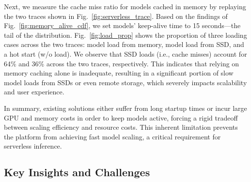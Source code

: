 Next, we measure the cache miss ratio for models cached in memory 
by replaying the two traces shown in Fig.~\ref{fig:serverless_trace}.
Based on the findings of Fig.~\ref{fig:memory_alive_cdf}, we set models' keep-alive time to 15 seconds---the tail of the distribution.
Fig.~\ref{fig:load_prop} shows the proportion of three loading cases across the two traces: model load from memory, model load from SSD, and a hot start (w/o load). 
We observe that SSD loads (i.e., cache misses) account for 64\% and 36\% across the two traces, respectively.
This indicates that relying on memory caching alone is inadequate, resulting in a significant portion of slow model loads from SSDs or even remote storage, which severely impacts scalability and user experience. 




In summary, existing solutions either suffer from long startup times or incur large GPU and memory costs in order to keep models active, forcing a rigid tradeoff between scaling efficiency and resource costs. 
This inherent limitation prevents the platform from achieving fast model scaling, a critical requirement for serverless inference.  





\subsection{Key Insights and Challenges}
\label{sec:challenges}

